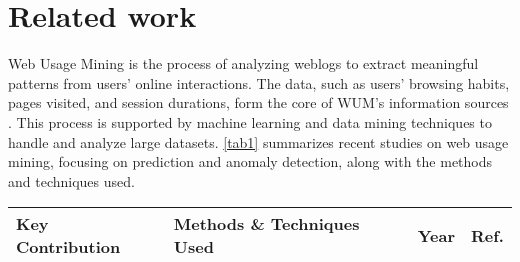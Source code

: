 \section{Related work}
\label{sec:2}

Web Usage Mining is the process of analyzing weblogs to extract meaningful patterns from users' online interactions. The data, such as users' browsing habits, pages visited, and session durations, form the core of WUM's information sources \cite{Yau2020}. This process is supported by machine learning and data mining techniques to handle and analyze large datasets. \cref{tab1} summarizes recent studies on web usage mining, focusing on prediction and anomaly detection, along with the methods and techniques used.


\begingroup
\setlength{\extrarowheight}{3pt}  %
\begin{table*}[htb]
	\setlength{\parindent}{0pt} %
	\centering
	\caption{Recent studies on web usage mining, prediction, and anomaly detection methods.}
	\label{tab1}
	\small
	\begin{tabular}{ m{} m{}
		>{\centering\arraybackslash}m{} >{\centering\arraybackslash}m{}  }
	\toprule
	\textbf{Key Contribution} & \textbf{Methods \& Techniques Used} & \textbf{Year} & \textbf{Ref.} \\ \hline 
	\midrule
	

\end{tabular}
\end{table*}
